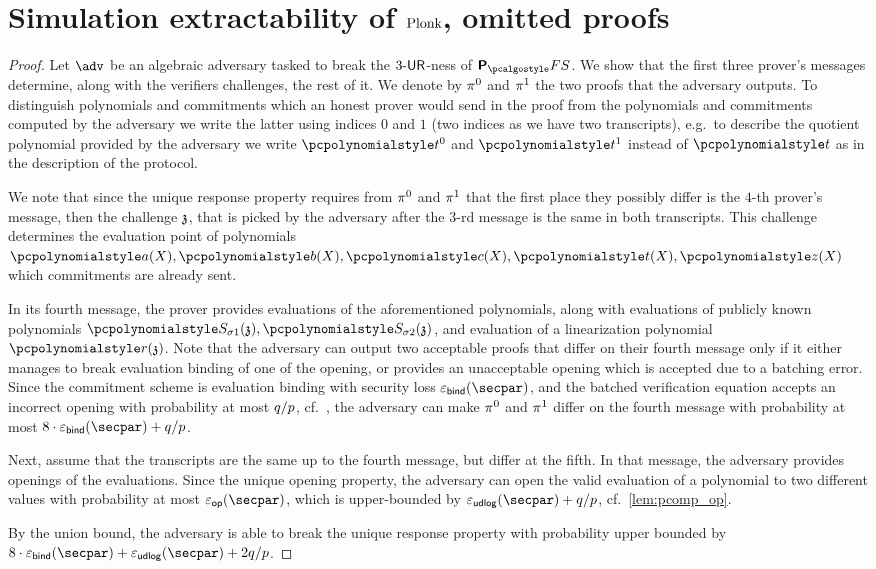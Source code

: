\section{Simulation extractability of $\textnormal{{Plonk}}$, omitted proofs}
\label{sec:plonkse_proofs}


\begin{proof}
    Let $\adv$ be an algebraic adversary tasked to break the ${3\text{-}\mathsf{UR}}$-ness of
      $\plonkprotfs$. We show that the first three prover's messages determine, along with 	the verifiers challenges, the rest of it. We denote by $\pi^0$ and $\pi^1$ the two proofs that the adversary outputs. To distinguish polynomials and commitments which an honest prover would send in the proof from the polynomials and commitments computed by the adversary we write the latter using indices $0$ and $1$ (two indices as we have two transcripts), e.g.~to describe the quotient polynomial provided by the adversary we write $\p{t}^0$ and $\p{t}^1$ instead of $\p{t}$ as in the description of the protocol.
  
    We note that since the unique response property requires from $\pi^{0}$ and $\pi^{1}$ that the first place they possibly differ is the $4$-th prover's message, then the challenge $\mathfrak{z}$, that is picked by the adversary after the $3$-rd message is the same in both transcripts. This challenge determines the evaluation point of polynomials $\p{a}(X), \p{b}(X), \p{c}(X), \p{t}(X), \p{z}(X)$ which commitments are already sent.
  
    In its fourth message, the prover provides evaluations of the aforementioned polynomials, along with evaluations of publicly known polynomials $
    \p{S_{\sigma 1}} (\chz), \p{S_{\sigma 2}} (\chz)$, and evaluation of a linearization polynomial $\p{r}(\chz)$.
    Note that the adversary can output two acceptable proofs that differ on their fourth message only if it either manages to break evaluation binding of one of the opening, or provides an unacceptable opening which is accepted due to a batching error. Since the commitment scheme is evaluation binding with security loss $\epsbinding (\secpar)$, and the batched verification equation accepts an incorrect opening with probability at most $q / p$, cf.~\cite{EPRINT:GabWilCio19}, the adversary can make $\pi^{0}$ and $\pi^{1}$ differ on the fourth message with probability at most $8  \cdot \epsbinding (\secpar) + \infrac{q}{p}$. 
  
    Next, assume that the transcripts are the same up to the fourth message, but differ at the fifth. In that message, the adversary provides openings of the evaluations. Since the unique opening property, the adversary can open the valid evaluation of a polynomial to two different values with probability at most $\epsop (\secpar)$, which is upper-bounded by $\epsudlog (\secpar) + \infrac{q}{p}$, cf.~\cref{lem:pcomp_op}.
  
    By the union bound, the adversary is able to break the unique response property with probability upper bounded by $8  \cdot \epsbinding (\secpar) + \epsudlog (\secpar) + 2 \infrac{q}{p}$.
    \end{proof}

